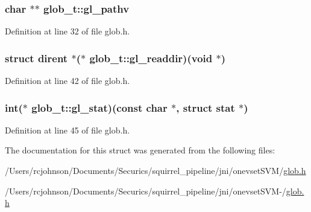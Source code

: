 \hypertarget{structglob__t_a3265051b3f19f438711c2b7699e475b7}{
\subsubsection[{gl\-\_\-pathv}]{\setlength{\rightskip}{0pt plus 5cm}char $\ast$$\ast$ glob\-\_\-t\-::gl\-\_\-pathv}}\label{structglob__t_a3265051b3f19f438711c2b7699e475b7}


Definition at line 32 of file glob.\-h.

\hypertarget{structglob__t_a29f5090e542b832345dd604422d0f719}{
\subsubsection[{gl\-\_\-readdir}]{\setlength{\rightskip}{0pt plus 5cm}struct dirent $\ast$($\ast$ glob\-\_\-t\-::gl\-\_\-readdir)(void $\ast$)\hspace{0.3cm}{\ttfamily [read]}}}\label{structglob__t_a29f5090e542b832345dd604422d0f719}


Definition at line 42 of file glob.\-h.

\hypertarget{structglob__t_a2e616c7c26e469ed25de6ce295f213f2}{
\subsubsection[{gl\-\_\-stat}]{\setlength{\rightskip}{0pt plus 5cm}int($\ast$ glob\-\_\-t\-::gl\-\_\-stat)(const char $\ast$, struct stat $\ast$)}}\label{structglob__t_a2e616c7c26e469ed25de6ce295f213f2}


Definition at line 45 of file glob.\-h.



The documentation for this struct was generated from the following files\-:\begin{DoxyCompactItemize}
\item 
/\-Users/rcjohnson/\-Documents/\-Securics/squirrel\-\_\-pipeline/jni/onevset\-S\-V\-M/\hyperlink{glob_8h}{glob.\-h}\item 
/\-Users/rcjohnson/\-Documents/\-Securics/squirrel\-\_\-pipeline/jni/onevset\-S\-V\-M-\//\hyperlink{_2glob_8h}{glob.\-h}\end{DoxyCompactItemize}
